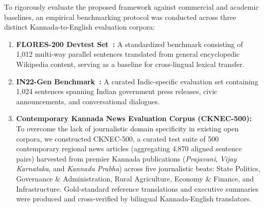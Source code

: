\documentclass[conference]{IEEEtran}
\begin{document}
To rigorously evaluate the proposed framework against commercial and academic baselines, an empirical benchmarking protocol was conducted across three distinct Kannada-to-English evaluation corpora:
\begin{enumerate}
    \item \textbf{FLORES-200 Devtest Set~\cite{nllb2024scaling}:} A standardized benchmark consisting of 1,012 multi-way parallel sentences translated from general encyclopedic Wikipedia content, serving as a baseline for cross-lingual lexical transfer.
    \item \textbf{IN22-Gen Benchmark~\cite{gala2023indictrans2}:} A curated Indic-specific evaluation set containing 1,024 sentences spanning Indian government press releases, civic announcements, and conversational dialogues.
    \item \textbf{Contemporary Kannada News Evaluation Corpus (CKNEC-500):} To overcome the lack of journalistic domain specificity in existing open corpora, we constructed CKNEC-500, a curated test suite of 500 contemporary regional news articles (aggregating 4,870 aligned sentence pairs) harvested from premier Kannada publications (\textit{Prajavani}, \textit{Vijay Karnataka}, and \textit{Kannada Prabha}) across five journalistic beats: State Politics, Governance \& Administration, Rural Agriculture, Economy \& Finance, and Infrastructure. Gold-standard reference translations and executive summaries were produced and cross-verified by bilingual Kannada-English translators.
\end{enumerate}
\end{document}
